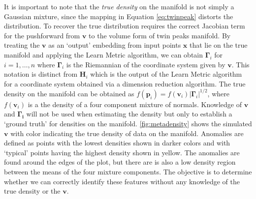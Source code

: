 \documentclass[11pt,a4paper,]{article}
\begin{document}
It is important to note that the \emph{true density} on the manifold is not simply a Gaussian mixture, since the mapping in Equation \eqref{eq:twinpeak} distorts the distribution. To recover the true distribution requires the correct Jacobian term for the pushforward from \(\pmb{v}\) to the volume form of twin peaks manifold. By treating the \(\pmb{v}\) as an `output' embedding from input points \(\pmb{x}\) that lie on the true manifold and applying the Learn Metric algorithm, we can obtain \(\pmb{\Gamma}_i\) for \(i=1,\dots,n\) where \(\pmb{\Gamma}_i\) is the Riemannian of the coordinate system given by \(\pmb{v}\). This notation is distinct from \(\pmb{H}_i\) which is the output of the Learn Metric algorithm for a coordinate system obtained via a dimension reduction algorithm. The true density on the manifold can be obtained as \(f(\pmb{p}_i)=f(\pmb{v}_i)|\pmb{\Gamma}_i|^{1/2}\), where \(f(\pmb{v}_i)\) is a the density of a four component mixture of normals. Knowledge of \(\pmb{v}\) and \(\pmb{\Gamma_i}\) will not be used when estimating the density but only to establish a `ground truth' for densities on the manifold. \autoref{fig:metadensity} shows the simulated \(\pmb{v}\) with color indicating the true density of data on the manifold. Anomalies are defined as points with the lowest densities shown in darker colors and with `typical' points having the highest density shown in yellow. The anomalies are found around the edges of the plot, but there are is also a low density region between the means of the four mixture components. The objective is to determine whether we can correctly identify these features without any knowledge of the true density or the \(\pmb{v}\).
\end{document}
